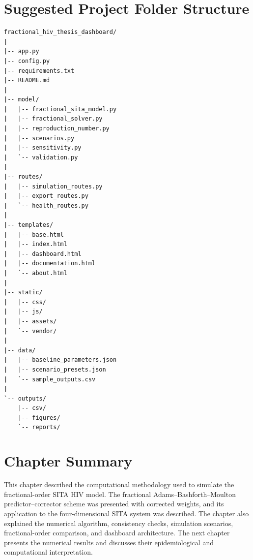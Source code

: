\section{Suggested Project Folder Structure}

\begin{lstlisting}[style=pythonstyle]
fractional_hiv_thesis_dashboard/
|
|-- app.py
|-- config.py
|-- requirements.txt
|-- README.md
|
|-- model/
|   |-- fractional_sita_model.py
|   |-- fractional_solver.py
|   |-- reproduction_number.py
|   |-- scenarios.py
|   |-- sensitivity.py
|   `-- validation.py
|
|-- routes/
|   |-- simulation_routes.py
|   |-- export_routes.py
|   `-- health_routes.py
|
|-- templates/
|   |-- base.html
|   |-- index.html
|   |-- dashboard.html
|   |-- documentation.html
|   `-- about.html
|
|-- static/
|   |-- css/
|   |-- js/
|   |-- assets/
|   `-- vendor/
|
|-- data/
|   |-- baseline_parameters.json
|   |-- scenario_presets.json
|   `-- sample_outputs.csv
|
`-- outputs/
    |-- csv/
    |-- figures/
    `-- reports/
\end{lstlisting}

\section{Chapter Summary}

This chapter described the computational methodology used to simulate the fractional-order SITA HIV model. The fractional Adams--Bashforth--Moulton predictor--corrector scheme was presented with corrected weights, and its application to the four-dimensional SITA system was described. The chapter also explained the numerical algorithm, consistency checks, simulation scenarios, fractional-order comparison, and dashboard architecture. The next chapter presents the numerical results and discusses their epidemiological and computational interpretation.
